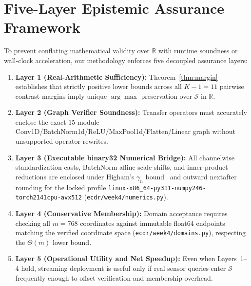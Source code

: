 \documentclass[11pt,oneside,a4paper]{report}
\newcommand{\R}{\mathbb{R}}
\newcommand{\code}[1]{{\small\upshape\ttfamily #1}}
\newcommand{\pathcode}[1]{{\small\upshape\ttfamily\nolinkurl{#1}}}
\newcommand{\Sset}{\mathcal{S}}
\theoremstyle{remark}
\begin{document}
\section{Five-Layer Epistemic Assurance Framework}
To prevent conflating mathematical validity over $\R$ with runtime soundness or wall-clock acceleration, our methodology enforces five decoupled assurance layers:
\begin{enumerate}[leftmargin=1.5em]
  \item \textbf{Layer 1 (Real-Arithmetic Sufficiency):} Theorem~\ref{thm:margin} establishes that strictly positive lower bounds across all $K-1=11$ pairwise contrast margins imply unique $\arg\max$ preservation over $\Sset$ in $\R$.
  \item \textbf{Layer 2 (Graph Verifier Soundness):} Transfer operators must accurately enclose the exact 15-module Conv1D/BatchNorm1d/ReLU/MaxPool1d/Flatten/Linear graph without unsupported operator rewrites.
  \item \textbf{Layer 3 (Executable \code{binary32} Numerical Bridge):} All channelwise standardization casts, BatchNorm affine scale-shifts, and inner-product reductions are enclosed under Higham's $\gamma_n$ bound~\cite{higham2002} and outward \code{nextafter} rounding for the locked profile \pathcode{linux-x86_64-py311-numpy246-torch2141cpu-avx512} (\nolinkurl{ecdr/week4/numerics.py}).
  \item \textbf{Layer 4 (Conservative Membership):} Domain acceptance requires checking all $m=768$ coordinates against immutable \code{float64} endpoints matching the verified coordinate space (\nolinkurl{ecdr/week4/domains.py}), respecting the $\Theta(m)$ lower bound.
  \item \textbf{Layer 5 (Operational Utility and Net Speedup):} Even when Layers~1--4 hold, streaming deployment is useful only if real sensor queries enter $\Sset$ frequently enough to offset verification and membership overhead.
\end{enumerate}
\end{document}
